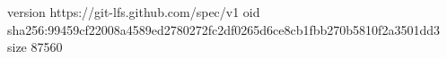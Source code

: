 version https://git-lfs.github.com/spec/v1
oid sha256:99459cf22008a4589ed2780272fc2df0265d6ce8cb1fbb270b5810f2a3501dd3
size 87560
